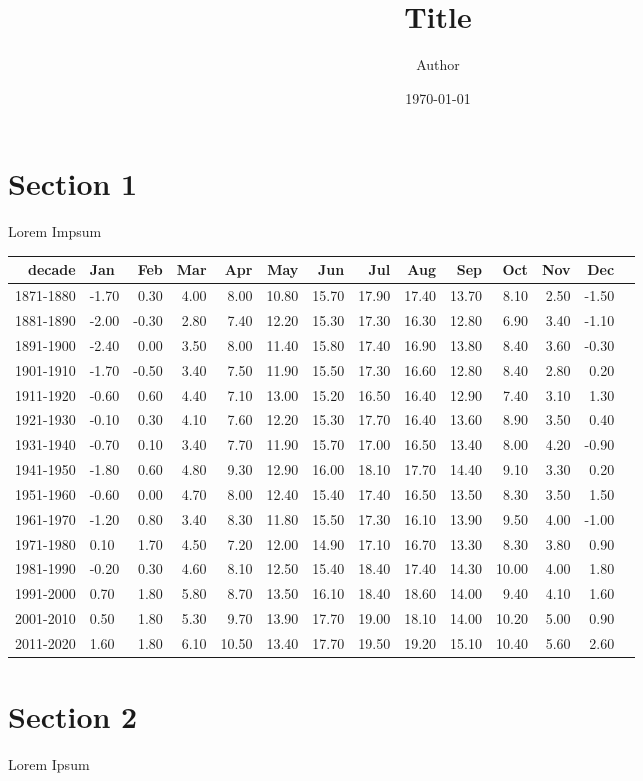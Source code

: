 \documentclass[11pt]{article}
\title{ Title}
\author{ Author }
\date{\today}
\begin{document}
\maketitle	
\pagebreak



\section{Section 1}

Lorem Impsum

\begin{table}[!hbtp]
\begin{center}
\begin{normalsize}
\begin{tabular}{rlrrrrrrrrrrrr}
\hline
decade&Jan&Feb&Mar&Apr&May&Jun&Jul&Aug&Sep&Oct&Nov&Dec\\ 
\hline
1871-1880&-1.70&0.30&4.00&8.00&10.80&15.70&17.90&17.40&13.70&8.10&2.50&-1.50\\ 
1881-1890&-2.00&-0.30&2.80&7.40&12.20&15.30&17.30&16.30&12.80&6.90&3.40&-1.10\\ 
1891-1900&-2.40&0.00&3.50&8.00&11.40&15.80&17.40&16.90&13.80&8.40&3.60&-0.30\\ 
1901-1910&-1.70&-0.50&3.40&7.50&11.90&15.50&17.30&16.60&12.80&8.40&2.80&0.20\\ 
1911-1920&-0.60&0.60&4.40&7.10&13.00&15.20&16.50&16.40&12.90&7.40&3.10&1.30\\ 
1921-1930&-0.10&0.30&4.10&7.60&12.20&15.30&17.70&16.40&13.60&8.90&3.50&0.40\\ 
1931-1940&-0.70&0.10&3.40&7.70&11.90&15.70&17.00&16.50&13.40&8.00&4.20&-0.90\\ 
1941-1950&-1.80&0.60&4.80&9.30&12.90&16.00&18.10&17.70&14.40&9.10&3.30&0.20\\ 
1951-1960&-0.60&0.00&4.70&8.00&12.40&15.40&17.40&16.50&13.50&8.30&3.50&1.50\\ 
1961-1970&-1.20&0.80&3.40&8.30&11.80&15.50&17.30&16.10&13.90&9.50&4.00&-1.00\\ 
1971-1980&0.10&1.70&4.50&7.20&12.00&14.90&17.10&16.70&13.30&8.30&3.80&0.90\\ 
1981-1990&-0.20&0.30&4.60&8.10&12.50&15.40&18.40&17.40&14.30&10.00&4.00&1.80\\ 
1991-2000&0.70&1.80&5.80&8.70&13.50&16.10&18.40&18.60&14.00&9.40&4.10&1.60\\ 
2001-2010&0.50&1.80&5.30&9.70&13.90&17.70&19.00&18.10&14.00&10.20&5.00&0.90\\ 
2011-2020&1.60&1.80&6.10&10.50&13.40&17.70&19.50&19.20&15.10&10.40&5.60&2.60\\ 
\hline
\end{tabular}
\end{normalsize}
\end{center}
\end{table}


\section{Section 2}
Lorem Ipsum \\

\end{document}
